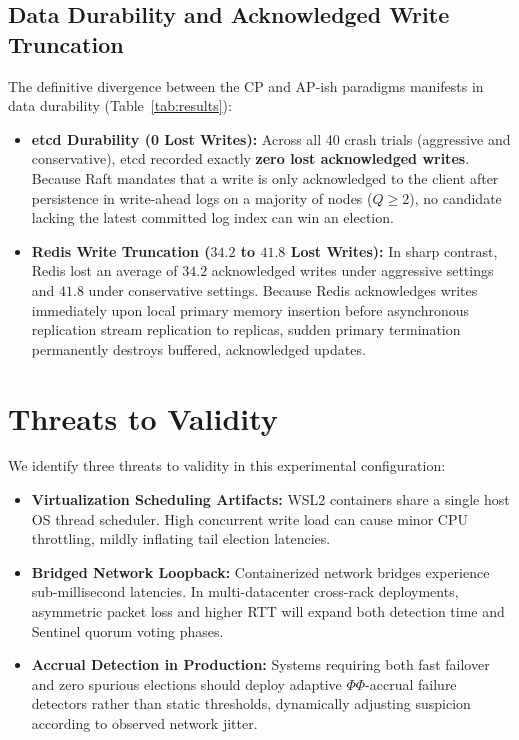 \documentclass[conference]{IEEEtran}
\begin{document}
\subsection{Data Durability and Acknowledged Write Truncation}
The definitive divergence between the CP and AP-ish paradigms manifests in data durability (Table~\ref{tab:results}):
\begin{itemize}
    \item \textbf{etcd Durability (0 Lost Writes):} Across all 40 crash trials (aggressive and conservative), etcd recorded exactly \textbf{zero lost acknowledged writes}. Because Raft mandates that a write is only acknowledged to the client after persistence in write-ahead logs on a majority of nodes ($Q \ge 2$), no candidate lacking the latest committed log index can win an election.
    \item \textbf{Redis Write Truncation ($34.2$ to $41.8$ Lost Writes):} In sharp contrast, Redis lost an average of $34.2$ acknowledged writes under aggressive settings and $41.8$ under conservative settings. Because Redis acknowledges writes immediately upon local primary memory insertion before asynchronous replication stream replication to replicas, sudden primary termination permanently destroys buffered, acknowledged updates.
\end{itemize}

\section{Threats to Validity}
We identify three threats to validity in this experimental configuration:
\begin{itemize}
    \item \textbf{Virtualization Scheduling Artifacts:} WSL2 containers share a single host OS thread scheduler. High concurrent write load can cause minor CPU throttling, mildly inflating tail election latencies.
    \item \textbf{Bridged Network Loopback:} Containerized network bridges experience sub-millisecond latencies. In multi-datacenter cross-rack deployments, asymmetric packet loss and higher RTT will expand both detection time and Sentinel quorum voting phases.
    \item \textbf{Accrual Detection in Production:} Systems requiring both fast failover and zero spurious elections should deploy adaptive $\Phi$$\Phi$-accrual failure detectors rather than static thresholds, dynamically adjusting suspicion according to observed network jitter.
\end{itemize}
\end{document}
